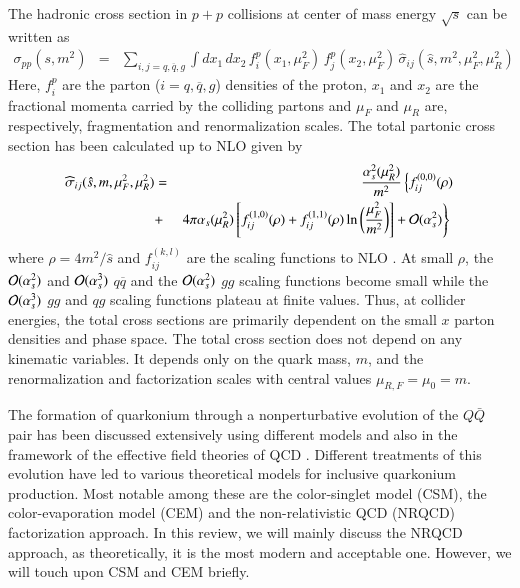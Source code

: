 The hadronic cross section in $p+p$ collisions at center of mass energy
$\sqrt{s}$ can be written as
\begin{eqnarray}
\sigma_{pp}(s,m^2) & = & \sum_{i,j = q, \overline q, g} 
\int dx_1 \, dx_2 \, 
f_i^p (x_1,\mu_F^2) \,
f_j^p(x_2,\mu_F^2) \, \widehat{\sigma}_{ij}(\hat{s},m^2,\mu_F^2,\mu_R^2)
\label{sigpp}
\end{eqnarray}
Here, $f_i^p$ are the parton (${i = q, \overline q, g}$) densities of the proton,
$x_1$ and $x_2$ are the fractional momenta carried by the colliding
partons and $\mu_F$ and $\mu_R$ are, respectively, fragmentation and renormalization scales. 
The total partonic cross section has been calculated up to NLO
\cite{Nason:1989zy,Nason:1987xz} given by
\begin{eqnarray}
\widehat{\sigma}_{ij}(\hat{s},m,\mu_F^2,\mu_R^2) & = & 
\frac{\alpha_s^2(\mu_R^2)}{m^2}
\left\{ f^{(0,0)}_{ij}(\rho) \right. \nonumber \\
 & + & \left. 4\pi \alpha_s(\mu_R^2) \left[f^{(1,0)}_{ij}(\rho) + 
f^{(1,1)}_{ij}(\rho)\ln\bigg(\frac{\mu_F^2}{m^2} \bigg) \right] 
+ {\cal O}(\alpha_s^2) \right\}
\,\, 
\label{sigpart}
\end{eqnarray}
where $\rho = 4m^2/\hat{s}$ and 
$f_{ij}^{(k,l)}$ are the scaling functions to NLO \cite{Nason:1989zy,Nason:1987xz}. 
At small $\rho$, the ${\cal O}(\alpha_s^2)$ and ${\cal O}(\alpha_s^3)$
$q \overline q$ and the ${\cal O}(\alpha_s^2)$ $gg$ scaling functions 
become small while the ${\cal O}(\alpha_s^3)$ $gg$ and $qg$ scaling functions
plateau at finite values.  Thus, at collider energies, the total cross sections
are primarily dependent on the small $x$ parton densities and phase space.
The total cross section does not depend on any kinematic variables. It depends  
only on the quark mass, $m$, and the renormalization and factorization scales with central
values $\mu_{R,F} =\mu_0 = m$.


The formation of quarkonium through a nonperturbative evolution of the $Q\bar Q$ pair 
has been discussed extensively using different models and also in the framework of the 
  effective field theories of QCD
\cite{Bodwin:1994jh,Brambilla:2004wf}. Different
treatments of this evolution have led to various theoretical models for
inclusive quarkonium production. Most notable among these are the color-singlet
model (CSM), the color-evaporation model (CEM) and the non-relativistic QCD
(NRQCD) factorization approach. In this review, we will mainly discuss the NRQCD 
approach, as theoretically, it is the most modern and acceptable one. However,
we will touch upon CSM and CEM briefly. 





